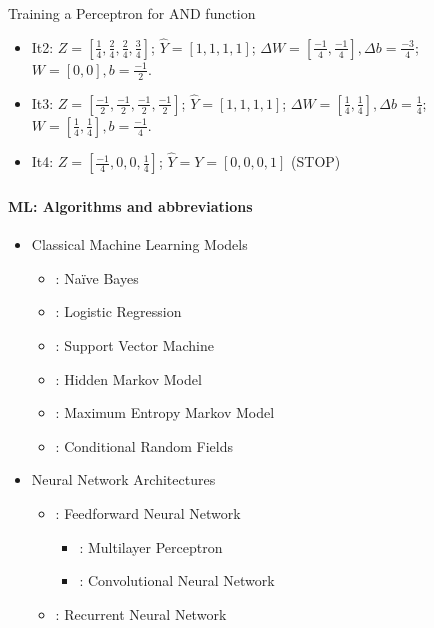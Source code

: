\documentclass[xcolor=table]{beamer}
\begin{document}
\begin{frame}
\begin{exampleblock}{Training a Perceptron for AND function}
\begin{minipage}{0.79\textwidth}
\begin{itemize}
				\item It2: $ Z = [\frac{1}{4}, \frac{2}{4}, \frac{2}{4}, \frac{3}{4}]$; 
				$ \hat{Y} = [1, 1, 1, 1] $;
				$ \Delta W = [\frac{-1}{4}, \frac{-1}{4}], \Delta b = \frac{-3}{4} $;
				$ W = [0, 0], b = \frac{-1}{2} $.
				
				\item It3: $ Z = [\frac{-1}{2}, \frac{-1}{2}, \frac{-1}{2}, \frac{-1}{2}] $; 
				$ \hat{Y} = [1, 1, 1, 1] $; 
				$ \Delta W = [\frac{1}{4}, \frac{1}{4}], \Delta b = \frac{1}{4} $;
				$ W = [\frac{1}{4}, \frac{1}{4}], b = \frac{-1}{4} $.
				
				\item It4: $ Z = [\frac{-1}{4}, 0, 0, \frac{1}{4}] $;
				$ \hat{Y} = Y = [0, 0, 0, 1] $ (STOP)
			\end{itemize}
		\end{minipage}
	\end{exampleblock}
	
\end{frame}
	
\begin{frame}
	\frametitle{\inserttitle}
	\framesubtitle{ML: Algorithms and abbreviations}
	
	\begin{itemize}
		\item Classical Machine Learning Models
		\begin{itemize}
			\item {}: Naïve Bayes
			\item {}: Logistic Regression
			\item {}: Support Vector Machine
			\item {}: Hidden Markov Model
			\item {}: Maximum Entropy Markov Model
			\item {}: Conditional Random Fields
		\end{itemize}
		
		\item Neural Network Architectures
		\begin{itemize}
			\item {}: Feedforward Neural Network
			\begin{itemize}
				\item {}: Multilayer Perceptron
				\item {}: Convolutional Neural Network
			\end{itemize}
			\item {}: Recurrent Neural Network
		\end{itemize}
	\end{itemize}
	
\end{frame}
\end{document}
